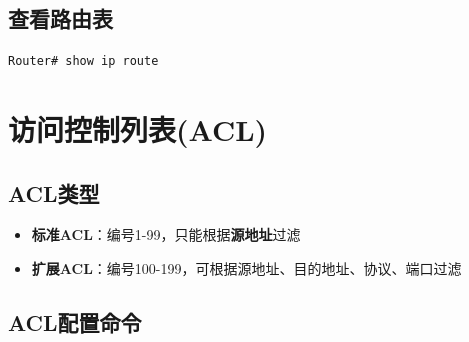 \documentclass[12pt,a4paper]{ctexart}
\begin{document}
\subsection{查看路由表}

\begin{cmdbox}
\begin{lstlisting}
Router# show ip route
\end{lstlisting}
\end{cmdbox}

\section{访问控制列表(ACL)}

\subsection{ACL类型}

\begin{itemize}[leftmargin=2em,itemsep=0pt]
    \item \textbf{标准ACL}：编号1-99，只能根据\textbf{源地址}过滤
    \item \textbf{扩展ACL}：编号100-199，可根据源地址、目的地址、协议、端口过滤
\end{itemize}

\subsection{ACL配置命令}
\end{document}
